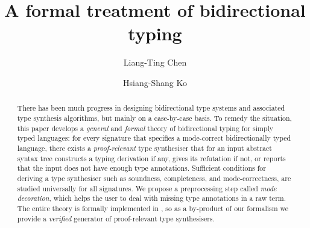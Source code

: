 \documentclass[orivec,envcountsect,envcountsame]{llncs}
\author{Liang-Ting Chen\orcidID{0000-0002-3250-1331} \and Hsiang-Shang Ko\orcidID{0000-0002-2439-1048}}
\institute{Institute of Information Science, Academia Sinica, Taiwan}
\title{A formal treatment of bidirectional typing}
\numberwithin{table}{section}
\begin{document}
\maketitle

\begin{abstract}
There has been much progress in designing bidirectional type systems and associated type synthesis algorithms, but mainly on a case-by-case basis.
To remedy the situation, this paper develops a \emph{general} and \emph{formal} theory of bidirectional typing for simply typed languages: for every signature that specifies a mode-correct bidirectionally typed language, there exists a \emph{proof-relevant} type synthesiser that for an input abstract syntax tree constructs a typing derivation if any, gives its refutation if not, or reports that the input does not have enough type annotations.
Sufficient conditions for deriving a type synthesiser such as soundness, completeness, and mode-correctness, are studied universally for all signatures.
We propose a preprocessing step called \emph{mode decoration}, which helps the user to deal with missing type annotations in a raw term.
The entire theory is formally implemented in \Agda, so as a by-product of our formalism we provide a \emph{verified} generator of proof-relevant type synthesisers.
\end{abstract}












\appendix



\end{document}
